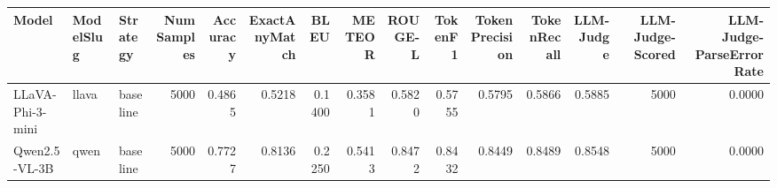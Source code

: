 \begin{tabular}{lllrrrrrrrrrrrr}
\toprule
Model & ModelSlug & Strategy & NumSamples & Accuracy & ExactAnyMatch & BLEU & METEOR & ROUGE-L & TokenF1 & TokenPrecision & TokenRecall & LLM-Judge & LLM-Judge-Scored & LLM-Judge-ParseErrorRate \\
\midrule
LLaVA-Phi-3-mini & llava & baseline & 5000 & 0.4865 & 0.5218 & 0.1400 & 0.3581 & 0.5820 & 0.5755 & 0.5795 & 0.5866 & 0.5885 & 5000 & 0.0000 \\
Qwen2.5-VL-3B & qwen & baseline & 5000 & 0.7727 & 0.8136 & 0.2250 & 0.5413 & 0.8472 & 0.8432 & 0.8449 & 0.8489 & 0.8548 & 5000 & 0.0000 \\
\bottomrule
\end{tabular}
